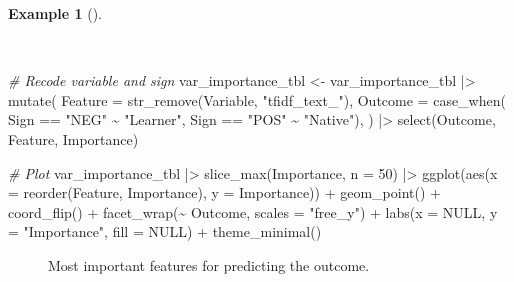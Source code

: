 \documentclass[
  letterpaper,
]{latex/krantz}
\newenvironment{Shaded}{\begin{snugshade}}{\end{snugshade}}
\newcommand{\AttributeTok}[1]{\textcolor[rgb]{0.00,0.00,0.00}{#1}}
\newcommand{\CommentTok}[1]{\textcolor[rgb]{0.00,0.00,0.00}{\textit{#1}}}
\newcommand{\ConstantTok}[1]{\textcolor[rgb]{0.00,0.00,0.00}{#1}}
\newcommand{\DecValTok}[1]{\textcolor[rgb]{0.00,0.00,0.00}{#1}}
\newcommand{\FunctionTok}[1]{\textcolor[rgb]{0.00,0.00,0.00}{#1}}
\newcommand{\NormalTok}[1]{\textcolor[rgb]{0.00,0.00,0.00}{#1}}
\newcommand{\OtherTok}[1]{\textcolor[rgb]{0.00,0.00,0.00}{#1}}
\newcommand{\SpecialCharTok}[1]{\textcolor[rgb]{0.00,0.00,0.00}{#1}}
\newcommand{\StringTok}[1]{\textcolor[rgb]{0.00,0.00,0.00}{#1}}
\theoremstyle{definition}
\newtheorem{example}{Example}[chapter]
\theoremstyle{remark}
\begin{document}
\begin{example}[]\protect\hypertarget{exm-pda-class-tune-hyperparameters-evaluate-test-vip-plot}{}\label{exm-pda-class-tune-hyperparameters-evaluate-test-vip-plot}

~

\begin{Shaded}
\begin{Highlighting}[]
\CommentTok{\# Recode variable and sign}
\NormalTok{var\_importance\_tbl }\OtherTok{\textless{}{-}}
\NormalTok{  var\_importance\_tbl }\SpecialCharTok{|\textgreater{}}
  \FunctionTok{mutate}\NormalTok{(}
    \AttributeTok{Feature =} \FunctionTok{str\_remove}\NormalTok{(Variable, }\StringTok{"tfidf\_text\_"}\NormalTok{),}
    \AttributeTok{Outcome =} \FunctionTok{case\_when}\NormalTok{(}
\NormalTok{      Sign }\SpecialCharTok{==} \StringTok{"NEG"} \SpecialCharTok{\textasciitilde{}} \StringTok{"Learner"}\NormalTok{,}
\NormalTok{      Sign }\SpecialCharTok{==} \StringTok{"POS"} \SpecialCharTok{\textasciitilde{}} \StringTok{"Native"}\NormalTok{),}
\NormalTok{    ) }\SpecialCharTok{|\textgreater{}}
  \FunctionTok{select}\NormalTok{(Outcome, Feature, Importance)}

\CommentTok{\# Plot}
\NormalTok{var\_importance\_tbl }\SpecialCharTok{|\textgreater{}}
  \FunctionTok{slice\_max}\NormalTok{(Importance, }\AttributeTok{n =} \DecValTok{50}\NormalTok{) }\SpecialCharTok{|\textgreater{}}
  \FunctionTok{ggplot}\NormalTok{(}\FunctionTok{aes}\NormalTok{(}\AttributeTok{x =} \FunctionTok{reorder}\NormalTok{(Feature, Importance), }\AttributeTok{y =}\NormalTok{ Importance)) }\SpecialCharTok{+}
  \FunctionTok{geom\_point}\NormalTok{() }\SpecialCharTok{+}
  \FunctionTok{coord\_flip}\NormalTok{() }\SpecialCharTok{+}
  \FunctionTok{facet\_wrap}\NormalTok{(}\SpecialCharTok{\textasciitilde{}}\NormalTok{ Outcome, }\AttributeTok{scales =} \StringTok{"free\_y"}\NormalTok{) }\SpecialCharTok{+}
  \FunctionTok{labs}\NormalTok{(}\AttributeTok{x =} \ConstantTok{NULL}\NormalTok{, }\AttributeTok{y =} \StringTok{"Importance"}\NormalTok{, }\AttributeTok{fill =} \ConstantTok{NULL}\NormalTok{) }\SpecialCharTok{+}
  \FunctionTok{theme\_minimal}\NormalTok{()}
\end{Highlighting}
\end{Shaded}

\begin{figure}[H]


\caption{\label{fig-pda-class-tune-hyperparameters-evaluate-test-vip-plot}Most
important features for predicting the outcome.}

\end{figure}%

\end{example}
\end{document}
